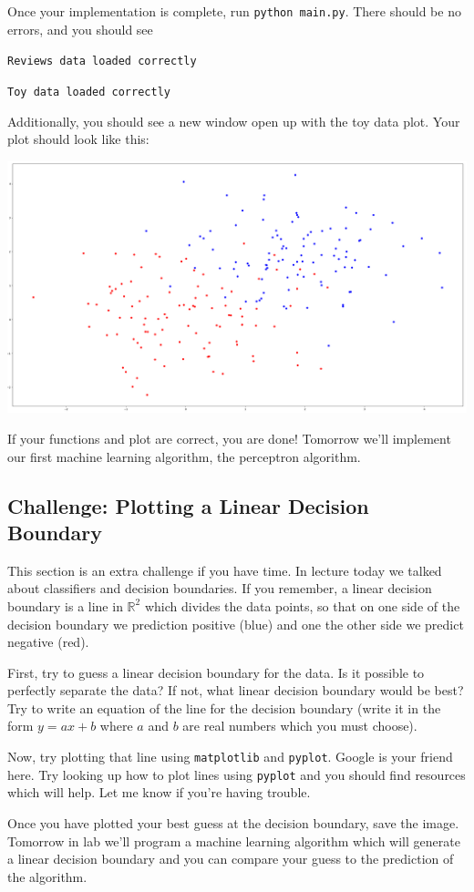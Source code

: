 \documentclass{article}
\begin{document}
Once your implementation is complete, run \texttt{python main.py}. There should be no errors, and you should see

\vspace{2mm}
\texttt{Reviews data loaded correctly}

\texttt{Toy data loaded correctly}
\vspace{2mm}

Additionally, you should see a new window open up with the toy data plot. Your plot should look like this:

\vspace{5mm}
\noindent
\includegraphics[width=\textwidth]{toy_data.png}
\vspace{5mm}

If your functions and plot are correct, you are done! Tomorrow we'll implement our first machine learning algorithm, the perceptron algorithm.

\subsection{Challenge: Plotting a Linear Decision Boundary}

This section is an extra challenge if you have time. In lecture today we talked about classifiers and decision boundaries. If you remember, a linear decision boundary is a line in $\mathbb{R}^2$ which divides the data points, so that on one side of the decision boundary we prediction positive (blue) and one the other side we predict negative (red).

First, try to guess a linear decision boundary for the data. Is it possible to perfectly separate the data? If not, what linear decision boundary would be best? Try to write an equation of the line for the decision boundary (write it in the form $y=ax+b$ where $a$ and $b$ are real numbers which you must choose).

Now, try plotting that line using \texttt{matplotlib} and \texttt{pyplot}. Google is your friend here. Try looking up how to plot lines using \texttt{pyplot} and you should find resources which will help. Let me know if you're having trouble.

Once you have plotted your best guess at the decision boundary, save the image. Tomorrow in lab we'll program a machine learning algorithm which will generate a linear decision boundary and you can compare your guess to the prediction of the algorithm.
\end{document}
